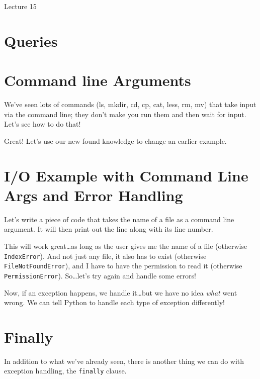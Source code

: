\documentclass[12pt]{article}
\begin{document}
\begin{center}
   \LARGE Lecture 15
\end{center}

\section*{Queries}

\section{Command line Arguments}

We've seen lots of commands (ls, mkdir, cd, cp, cat, less, rm, mv) that take
input via the command line; they don't make you run them and then wait for
input.  Let's see how to do that!



\noindent
Great!  Let's use our new found knowledge to change an earlier example.

\section{I/O Example with Command Line Args and Error Handling}

Let's write a piece of code that takes the name of a file as a command line
argument.  It will then print out the line along with its line number.



\noindent
This will work great\dots as long as the user gives me the name of a file
(otherwise \lstinline{IndexError}).  And not just any file, it also has to
exist (otherwise \lstinline{FileNotFoundError}), and I have to have the
permission to read it (otherwise \lstinline{PermissionError}).  So\dots let's
try again and handle some errors!



\noindent
Now, if an exception happens, we handle it\dots but we have no idea \emph{what}
went wrong.  We can tell Python to handle each type of exception differently!



\section{Finally}

In addition to what we've already seen, there is another thing we can do with
exception handling, the \lstinline{finally} clause.
\end{document}
